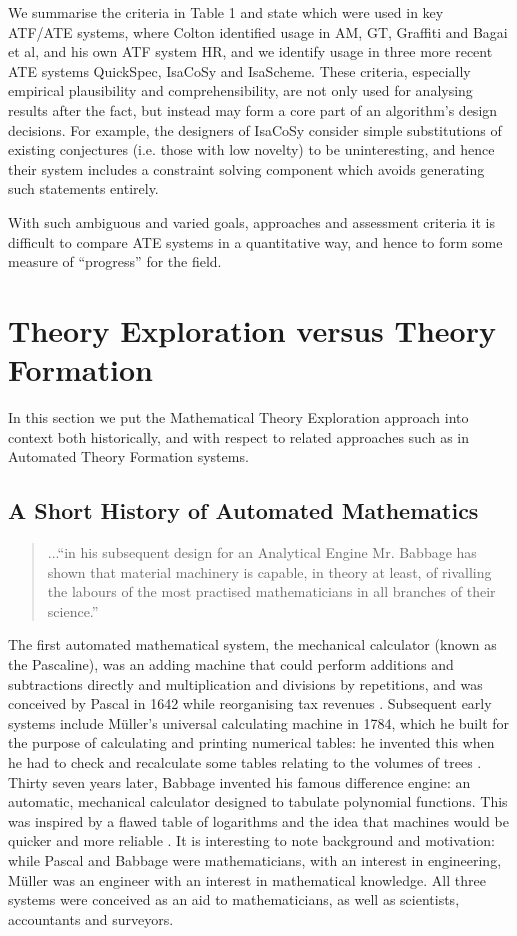 We summarise the criteria in Table 1 and state which were used in key
ATF/ATE systems, where Colton identified usage in AM, GT, Graffiti and
Bagai et al, and his own ATF system HR, and we identify usage in three
more recent ATE systems QuickSpec, IsaCoSy and IsaScheme. These
criteria, especially empirical plausibility and comprehensibility, are
not only used for analysing results after the fact, but instead may
form a core part of an algorithm's design decisions. For example, the
designers of IsaCoSy consider simple substitutions of existing
conjectures (i.e. those with low novelty) to be uninteresting, and
hence their system includes a constraint solving component which
avoids generating such statements entirely.

With such ambiguous and varied goals, approaches and assessment
criteria it is difficult to compare ATE systems in a quantitative way,
and hence to form some measure of ``progress'' for the field.

\section{Theory Exploration versus Theory
  Formation}\label{exploration-versus-formation}

In this section we put the Mathematical Theory Exploration approach
into context both historically, and with respect to related approaches
such as in Automated Theory Formation systems.

\subsection{A Short History of Automated Mathematics}

\begin{quote}
...``in his subsequent design for an Analytical Engine Mr. Babbage has
shown that material machinery is capable, in theory at least, of
rivalling the labours of the most practised mathematicians in all
branches of their science.'' \cite[p. 498]{jevons}
\end{quote}

The first automated mathematical system, the mechanical calculator
(known as the Pascaline), was an adding machine that could perform
additions and subtractions directly and multiplication and divisions
by repetitions, and was conceived by Pascal in 1642 while reorganising
tax revenues \cite{d'ocagne}. Subsequent early systems include
M\"uller's universal calculating machine in 1784, which he built for
the purpose of calculating and printing numerical tables: he invented
this when he had to check and recalculate some tables relating to the
volumes of trees \cite[p. 65]{lindgren}. Thirty seven years later,
Babbage invented his famous difference engine: an automatic,
mechanical calculator designed to tabulate polynomial functions. This
was inspired by a flawed table of logarithms and the idea that
machines would be quicker and more reliable \cite{bowden}. It is
interesting to note background and motivation: while Pascal and
Babbage were mathematicians, with an interest in engineering, M\"uller
was an engineer with an interest in mathematical knowledge. All three
systems were conceived as an aid to mathematicians, as well as
scientists, accountants and surveyors.

